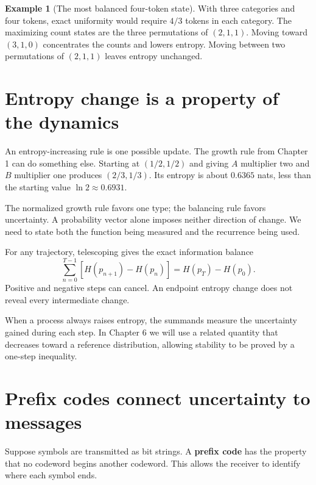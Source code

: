 \documentclass[11pt,oneside,openany]{book}
\theoremstyle{definition}
\newtheorem{example}{Example}[chapter]
\theoremstyle{remark}
\numberwithin{equation}{chapter}
\begin{document}
\begin{example}[The most balanced four-token state]

With three categories and four tokens, exact uniformity would require \(4/3\) tokens in each category. The maximizing count states are the three permutations of \((2,1,1)\). Moving toward \((3,1,0)\) concentrates the counts and lowers entropy. Moving between two permutations of \((2,1,1)\) leaves entropy unchanged.

\end{example}

\section{Entropy change is a property of the dynamics}\label{ch05-entropy-change-is-a-property-of-the-dynamics}

An entropy-increasing rule is one possible update. The growth rule from Chapter 1 can do something else. Starting at \((1/2,1/2)\) and giving \(A\) multiplier two and \(B\) multiplier one produces \((2/3,1/3)\). Its entropy is about \(0.6365\) nats, less than the starting value \(\ln2\approx0.6931\).

The normalized growth rule favors one type; the balancing rule favors uncertainty. A probability vector alone imposes neither direction of change. We need to state both the function being measured and the recurrence being used.

For any trajectory, telescoping gives the exact information balance \[\boxed{\sum_{n=0}^{T-1}[H(p_{n+1})-H(p_n)]
=H(p_T)-H(p_0).}\] Positive and negative steps can cancel. An endpoint entropy change does not reveal every intermediate change.

When a process always raises entropy, the summands measure the uncertainty gained during each step. In Chapter 6 we will use a related quantity that decreases toward a reference distribution, allowing stability to be proved by a one-step inequality.

\section{Prefix codes connect uncertainty to messages}\label{ch05-prefix-codes-connect-uncertainty-to-messages}

Suppose symbols are transmitted as bit strings. A \textbf{prefix code} has the property that no codeword begins another codeword. This allows the receiver to identify where each symbol ends.
\end{document}
